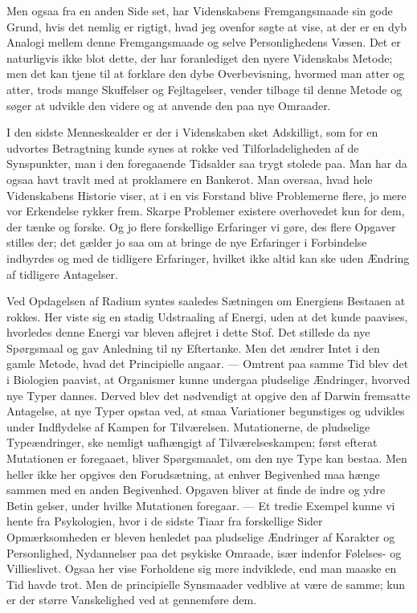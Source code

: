 \documentclass[12pt,a4paper]{article}
\newcommand{\opage}[1]{\marginnote{\footnotesize\textit{[#1]}}}
\begin{document}
Men ogsaa fra en anden Side set, har Videnskabens Fremgangsmaade sin gode
Grund, hvis det nemlig er rigtigt, hvad jeg ovenfor søgte at vise, at der er
en dyb Analogi mellem denne Fremgangsmaade og selve Personlighedens Væsen.
Det er naturligvis ikke blot dette, der har foranlediget den nyere
Videnskabs Metode; men det kan tjene til at forklare den dybe Overbevisning,
hvormed man atter og atter, trods mange Skuffelser og \opage{25} Fejltagelser, vender
tilbage til denne Metode og søger at udvikle den videre og at anvende den
paa nye Omraader.

I den sidste Menneskealder er der i Videnskaben sket Adskilligt, som for en
udvortes Betragtning kunde synes at rokke ved Tilforladeligheden af de
Synspunkter, man i den foregaaende Tidsalder saa trygt stolede paa. Man har
da ogsaa havt travlt med at proklamere en Bankerot. Man oversaa, hvad hele
Videnskabens Historie viser, at i en vis Forstand blive Problemerne flere,
jo mere vor Erkendelse rykker frem. Skarpe Problemer existere overhovedet
kun for dem, der tænke og forske. Og jo flere forskellige Erfaringer vi
gøre, des flere Opgaver stilles der; det gælder jo saa om at bringe de nye
Erfaringer i Forbindelse indbyrdes og med de tidligere Erfaringer, hvilket
ikke altid kan ske uden Ændring af tidligere Antagelser.

Ved Opdagelsen af Radium syntes saaledes Sætningen om Energiens Bestaaen at
rokkes. Her viste sig en stadig Udstraaling af Energi, uden at det kunde
paavises, hvorledes denne Energi var bleven aflejret i dette Stof. Det
stillede da nye Spørgsmaal og gav Anledning til ny Eftertanke. Men det
ændrer Intet i den gamle Metode, hvad det Principielle angaar. --- Omtrent
paa samme Tid blev det i Biologien paavist, at Organismer kunne undergaa
pludselige Ændringer, hvorved nye Typer dannes. Derved blev det nødvendigt
at opgive den af Darwin fremsatte Antagelse, at nye Typer opstaa ved, at
smaa Variationer begunstiges og udvikles under Indflydelse af Kampen for
Tilværelsen. Mutationerne, de pludselige Typeændringer, ske nemligt
uafhængigt af Tilværelseskampen; først efterat Mutationen er foregaaet,
bliver Spørgsmaalet, om den nye Type kan bestaa. Men heller ikke her opgives
den Forudsætning, at enhver Begivenhed maa hænge sammen med en anden
Begivenhed. Opgaven bliver at finde de indre og ydre Betin%
\opage{26}gelser, under
hvilke Mutationen foregaar. --- Et tredie Exempel kunne vi hente fra
Psykologien, hvor i de sidste Tiaar fra forskellige Sider Opmærksomheden er
bleven henledet paa pludselige Ændringer af Karakter og Personlighed,
Nydannelser paa det psykiske Omraade, især indenfor Følelses- og
Villieslivet. Ogsaa her vise Forholdene sig mere indviklede, end man maaske
en Tid havde trot. Men de principielle Synsmaader vedblive at være de samme;
kun er der større Vanskelighed ved at gennemføre dem.
\end{document}
